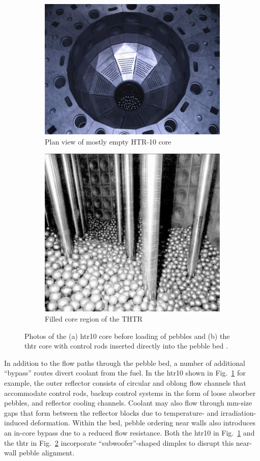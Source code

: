 \begin{figure}[!h]
\centering
\begin{subfigure}{.485\textwidth}
  \centering
  \includegraphics[height=0.5\linewidth]{figs/htr10.png}
  \caption{Plan view of mostly empty HTR-10 core}
  \label{fig:corea}
\end{subfigure}
\begin{subfigure}{.485\textwidth}
  \centering
  \includegraphics[height=0.5\linewidth]{figs/thtr_core.png}
  \caption{Filled core region of the THTR}
  \label{fig:coreb}
\end{subfigure}
\caption{Photos of the (a) \gls{htr10} core before loading of pebbles \cite{HTGRLessonsLearned} and (b) the \gls{thtr} core with control rods inserted directly into the pebble bed \cite{thtr_core}.}
\label{fig:core}
\end{figure}

In addition to the flow paths through the pebble bed, a number of additional ``bypass'' routes divert coolant from the fuel. In the \gls{htr10} shown in Fig.\ \ref{fig:corea} for example, the outer reflector consists of circular and oblong flow channels that accommodate control rods, backup control systems in the form of loose absorber pebbles, and reflector cooling channels. Coolant may also flow through \si{\milli\meter}-size gaps that form between the reflector blocks due to temperature- and irradiation-induced deformation. Within the bed, pebble ordering near walls also introduces an in-core bypass due to a reduced flow resistance. Both the \gls{htr10} in Fig.\ \ref{fig:corea} and the \gls{thtr} in Fig.\ \ref{fig:coreb} incorporate ``subwoofer''-shaped dimples to disrupt this near-wall pebble alignment.

